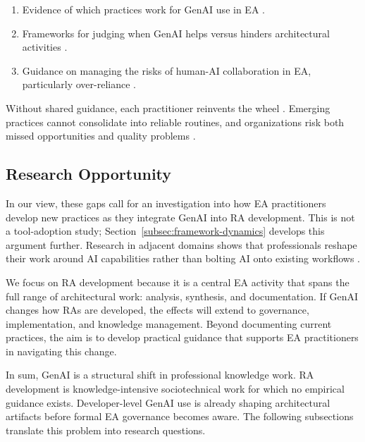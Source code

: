 \begin{enumerate}
    \item Evidence of which practices work for GenAI use in EA
          \parencite{banh_affordance_genai_ea_2025}.
    \item Frameworks for judging when GenAI helps versus hinders architectural
          activities \parencite{esposito_genai_architecture_2026}.
    \item Guidance on managing the risks of human-AI collaboration in EA,
          particularly over-reliance \parencite{dellacqua_navigating_2023}.
\end{enumerate}

Without shared guidance, each practitioner reinvents the wheel
\parencite{feldman_theorizing_2011}. Emerging practices cannot consolidate into
reliable routines, and organizations risk both missed opportunities and quality
problems \parencite{dellacqua_navigating_2023}.

\subsection{Research Opportunity}

In our view, these gaps call for an investigation into how EA practitioners
develop new practices as they integrate GenAI into RA development. This is not
a tool-adoption study; Section~\ref{subsec:framework-dynamics} develops this argument further. Research in adjacent domains shows that professionals
reshape their work around AI capabilities rather than bolting AI onto existing
workflows \parencite{noy_experimental_2023, dellacqua_navigating_2023}.

We focus on RA development because it is a central EA activity
\parencite{cloutier_concept_2010, the_open_group_togaf_2022} that spans the
full range of architectural work: analysis, synthesis, and documentation. If
GenAI changes how RAs are developed, the effects will extend to governance,
implementation, and knowledge management. Beyond documenting current practices,
the aim is to develop practical guidance that supports EA practitioners in
navigating this change.

In sum, GenAI is a structural shift in professional knowledge work. RA
development is knowledge-intensive sociotechnical work for which no empirical
guidance exists. Developer-level GenAI use is already shaping architectural
artifacts before formal EA governance becomes aware. The following subsections
translate this problem into research questions.

